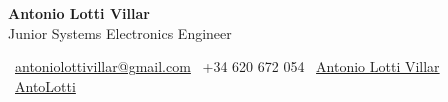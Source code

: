 %

\begin{center}
    {\Huge \textbf{Antonio Lotti Villar}} \\[0.3cm]
    {\Large Junior Systems Electronics Engineer} \\[10pt]


    \normalsize
    
    \faEnvelope \  \href{mailto:antoniolottivillar@gmail.com}{antoniolottivillar@gmail.com} \quad
    \faPhone \      +34 620 672 054 \quad
    \faLinkedin \     \href{https://www.linkedin.com/in/antonioLottiVillar/}{Antonio Lotti Villar} \quad
    \faGithub\       \href{https://github.com/AntoLotti}{AntoLotti} 
    \\[0.3cm]

\end{center}

